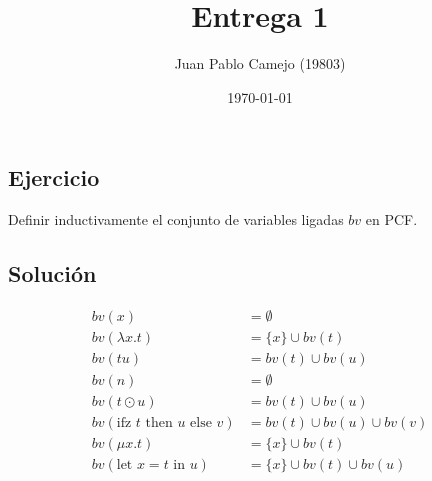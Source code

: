 \documentclass[a4paper,10pt]{article} %
\title{Entrega 1}
\author{Juan Pablo Camejo (19803)}
\date{\today}  %
\begin{document}
\maketitle   %

\subsection*{Ejercicio}
Definir inductivamente el conjunto de variables ligadas $bv$ en PCF.

\subsection*{Solución}

$$
\begin{aligned}
    bv(x) &= \emptyset\\
    bv(\lambda x.t) &= \{x\} \cup bv(t) \\
    bv(tu) &= bv(t)\cup bv(u)\\
    bv(n) &= \emptyset\\
    bv(t\odot u) &= bv(t)\cup bv(u)\\
    bv(\text{ifz } t \text{ then } u \text{ else } v) &= bv(t)\cup bv(u) \cup bv(v)\\
    bv(\mu x.t) &= \{x\} \cup bv(t)\\
    bv(\text{let } x = t \text{ in } u) &= \{x\} \cup bv(t) \cup bv(u)\\
\end{aligned}
$$
\end{document}
